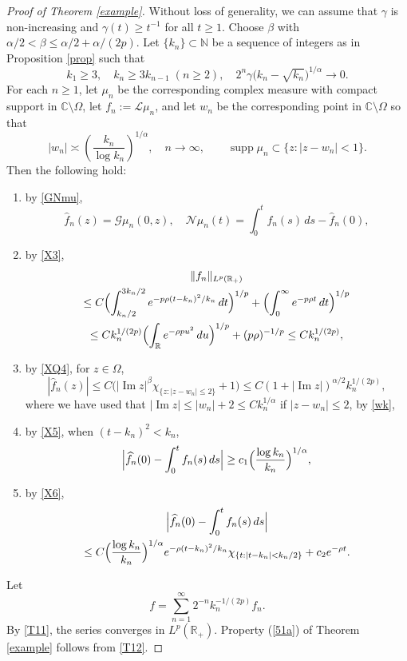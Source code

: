 \documentclass[11pt]{amsart}
\theoremstyle{definition}
\theoremstyle{remark}
\numberwithin{equation}{section}
\begin{document}
\begin{proof}[Proof of Theorem \rm\ref{example}]
Without loss of generality, we can assume that $\gamma$ is non-increasing and $\gamma(t) \ge t^{-1}$ for all $t\ge1$.  Choose $\beta$ with $\alpha/2 < \beta \le \alpha/2 + \alpha/(2p)$.  Let $\{k_n\}\subset \mathbb N$ be a sequence of integers as in Proposition \ref{prop} such that
$$
k_1 \ge 3, \quad  k_n \ge 3k_{n-1} \; (n\ge2), \quad 2^n \gamma\big(k_n-\sqrt{k_n}\big)^{1/\alpha} \to 0.
$$
For each $n\ge1$, let $\mu_n$ be the corresponding complex measure with compact support in ${{\mathbb C}} \setminus \Omega$, let $f_n:= \mathcal{L}\mu_n$, and let $w_n$ be the corresponding point in ${{\mathbb C}} \setminus \Omega$ so that
\begin{equation*} 
|w_n| \asymp  \left(\frac{k_n}{\log k_n} \right)^{1/\alpha}, \quad n\to\infty,
\qquad {\operatorname{supp}} \mu_n \subset \{z: |z-w_n|<1\}.
\end{equation*}
Then the following hold:
\begin{enumerate}[\rm(i)]
\item by \eqref{GNmu},
$$
\widehat f_n(z) = \mathcal G\mu_n(0,z),  \quad {{\mathcal N}}\mu_n(t) = \int_0^t f_n(s) \,ds - \widehat f_n(0),
$$
\item by \eqref{X3},
\begin{multline} \label{T11}
\|f_n\|_{L^p(\mathbb R_+)} \\
\le C \Bigl( \int_{k_n/2}^{3k_n/2} e^{-p\rho (t-k_n)^2/k_n}\, dt \Bigr)^{1/p} + \Bigl(\int_0^\infty e^{-p\rho t} \, dt \Bigr)^{1/p} \\
\le C k_n^{1/(2p)} \Bigl(\int_{{\mathbb R}}  e^{-\rho p u^2} \,du \Bigr)^{1/p} + (p \rho)^{-1/p}
\le C k_n^{1/(2p)},
\end{multline}
\item by \eqref{XQ4}, for $z\in\Omega$,
\begin{equation} \label{T12}
|\widehat f_n(z)| \le C\big(|{\operatorname{Im}} z|^\beta \chi_{\{z:|z-w_n|\le 2\}} + 1\big)
\le C(1+ |{\operatorname{Im}} z|)^{\alpha/2} k_n^{1/(2p)},
\end{equation}
where we have used that  $|{\operatorname{Im}} z| \le |w_n|+2 \le Ck_n^{1/\alpha}$ if $|z-w_n|\le2$, by \eqref{wk},
\item by \eqref{X5}, when $(t-k_n)^2 < k_n$,
\begin{equation*}
\Big|\widehat f_n(0) - \int_0^t f_n(s) \, ds\Big|\ge c_1\Bigl(\frac{\log
k_n}{k_n}\Bigr)^{1/\alpha}, 
\end{equation*}
\item by \eqref{X6},
\begin{multline*}
\Big|\widehat f_n(0)- \int_0^t f_n(s) \, ds \Big|\\ \le C\Bigl(\frac{\log k_n}{k_n}\Bigr)^{1/\alpha}e^{-\rho(t-k_n)^2/k_n}\chi_{\{t:|t-k_n|<k_n/2\}}+ c_2 e^{-\rho t}.
\end{multline*}
\end{enumerate}
Let
$$
f=\sum_{n=1}^\infty 2^{-n}k_{n}^{-1/(2p)}f_{n}.
$$
By \eqref{T11}, the series converges in $L^p(\mathbb R_+)$.  Property (\ref{51a}) of Theorem \ref{example} follows from \eqref{T12}.


\end{proof}
\end{document}

